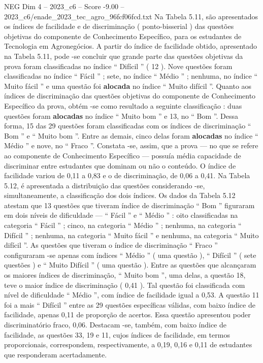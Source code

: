 \begin{textsample}{NEG Dim 4 – 2023\_c6 – Score -9.00 – 2023\_c6/enade\_2023\_tec\_agro\_96fcf06fcd.txt}
Na Tabela 5.11, são apresentados os índices de facilidade e de discriminação ( ponto-bisserial ) das questões objetivas do componente de Conhecimento Específico, para os estudantes de Tecnologia em Agronegócios.
A partir do índice de facilidade obtido, apresentado na Tabela 5.11, pode -se concluir que grande parte das questões objetivas da prova foram classificadas no índice “ Difícil ” ( 12 ).
Nove questões foram classificadas no índice “ Fácil ” ; sete, no índice “ Médio ” ; nenhuma, no índice “ Muito fácil ” e uma questão foi \textbf{alocada} no índice “ Muito difícil ”.
Quanto aos índices de discriminação das questões objetivas do componente de Conhecimento Específico da prova, obtém -se como resultado a seguinte classificação : duas questões foram \textbf{alocadas} no índice “ Muito bom ” e 13, no “ Bom ”.
Dessa forma, 15 das 29 questões foram classificadas com os índices de discriminação “ Bom ” e “ Muito bom ”.
Entre as demais, cinco delas foram \textbf{alocadas} no índice “ Médio ” e nove, no “ Fraco ”.
Constata -se, assim, que a prova — no que se refere ao componente de Conhecimento Específico — possuía média capacidade de discriminar entre estudantes que dominam ou não o conteúdo.
O índice de facilidade variou de 0,11 a 0,83 e o de discriminação, de 0,06 a 0,41.
Na Tabela 5.12, é apresentada a distribuição das questões considerando -se, simultaneamente, a classificação dos dois índices.
Os dados da Tabela 5.12 atestam que 13 questões que tiveram índice de discriminação “ Bom ” figuraram em dois níveis de dificuldade — “ Fácil ” e “ Médio ” : oito classificadas na categoria “ Fácil ” ; cinco, na categoria “ Médio ” ; nenhuma, na categoria “ Difícil ” ; nenhuma, na categoria “ Muito fácil ” e nenhuma, na categoria “ Muito difícil ”.
As questões que tiveram o índice de discriminação “ Fraco ” configuraram -se apenas com índices “ Médio ” ( uma questão ), “ Difícil ” ( sete questões ) e “ Muito Difícil ” ( uma questão ).
Entre as questões que alcançaram os maiores índices de discriminação, “ Muito bom ”, uma delas, a questão 18, teve o maior índice de discriminação ( 0,41 ).
Tal questão foi classificada com nível de dificuldade “ Médio ”, com índice de facilidade igual a 0,53.
A questão 11 foi a mais “ Difícil ” entre as 29 questões específicas válidas, com baixo índice de facilidade, apenas 0,11 de proporção de acertos.
Essa questão apresentou poder discriminatório fraco, 0,06.
Destacam -se, também, com baixo índice de facilidade, as questões 33, 19 e 11, cujos índices de facilidade, em termos proporcionais, correspondem, respectivamente, a 0,19, 0,16 e 0,11 de estudantes que responderam acertadamente.

\end{textsample}
